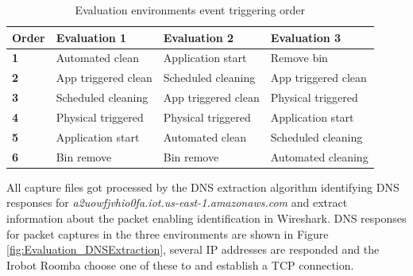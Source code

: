 \begin{table}[H]
\small
\centering
\caption{Evaluation environments event triggering order}
\label{tab:evaleventoverview}
\begin{tabular}{|l|l|l|l|}
\hline
\textbf{Order} & \textbf{Evaluation 1}          & \textbf{Evaluation 2}          & \textbf{Evaluation 3}          \\ \hline
\textbf{1}        & Automated clean                & Application start              & Remove bin                     \\ \hline
\textbf{2}        & App triggered clean            & Scheduled cleaning             & App triggered clean            \\ \hline
\textbf{3}        & Scheduled cleaning             & App triggered clean            & Physical triggered            \\ \hline
\textbf{4}        & Physical triggered            & Physical triggered            & Application start              \\ \hline
\textbf{5}        & Application start              & Automated clean                & Scheduled cleaning             \\ \hline
\textbf{6}        & Bin remove                     & Bin remove                     & Automated cleaning             \\ \hline
\end{tabular}
\end{table}

All capture files got processed by the DNS extraction algorithm identifying DNS responses for \textit{a2uowfjvhio0fa.iot.us-east-1.amazonaws.com} and extract information about the packet enabling identification in Wireshark. DNS responses for packet captures in the three environments are shown in Figure \ref{fig:Evaluation_DNSExtraction}, several IP addresses are responded and the Irobot Roomba choose one of these to and establish a TCP connection. 


